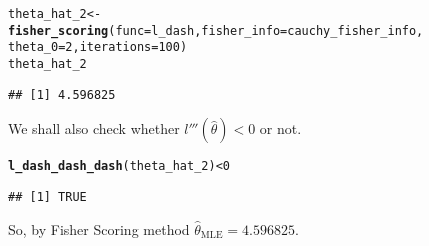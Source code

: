 \documentclass[11pt, a4paper]{article}\usepackage[]{graphicx}\usepackage[]{xcolor}
\makeatletter
\newcommand{\hlnum}[1]{\textcolor[rgb]{0.686,0.059,0.569}{#1}}%
\newcommand{\hlopt}[1]{\textcolor[rgb]{0,0,0}{#1}}%
\newcommand{\hldef}[1]{\textcolor[rgb]{0.345,0.345,0.345}{#1}}%
\newcommand{\hlkwb}[1]{\textcolor[rgb]{0.69,0.353,0.396}{#1}}%
\newcommand{\hlkwc}[1]{\textcolor[rgb]{0.333,0.667,0.333}{#1}}%
\newcommand{\hlkwd}[1]{\textcolor[rgb]{0.737,0.353,0.396}{\textbf{#1}}}%
\newenvironment{kframe}{%
 \def\at@end@of@kframe{}%
 \ifinner\ifhmode%
  \def\at@end@of@kframe{\end{minipage}}%
  \begin{minipage}{\columnwidth}%
 \fi\fi%
 \def\FrameCommand##1{\hskip\@totalleftmargin \hskip-\fboxsep
 \colorbox{shadecolor}{##1}\hskip-\fboxsep
     \hskip-\linewidth \hskip-\@totalleftmargin \hskip\columnwidth}%
 \MakeFramed {\advance\hsize-\width
   \@totalleftmargin\z@ \linewidth\hsize
   \@setminipage}}%
 {\par\unskip\endMakeFramed%
 \at@end@of@kframe}
\newenvironment{knitrout}{}{} %
\makeatother
\begin{document}
\begin{knitrout}
\color{fgcolor}\begin{kframe}
\begin{alltt}
\hldef{theta_hat_2} \hlkwb{<-} \hlkwd{fisher_scoring}\hldef{(}\hlkwc{func} \hldef{= l_dash,} \hlkwc{fisher_info} \hldef{= cauchy_fisher_info,}
                              \hlkwc{theta_0} \hldef{=} \hlnum{2}\hldef{,} \hlkwc{iterations} \hldef{=} \hlnum{100}\hldef{)}
\hldef{theta_hat_2}
\end{alltt}
\begin{verbatim}
## [1] 4.596825
\end{verbatim}
\end{kframe}
\end{knitrout}

We shall also check whether $l'''(\hat{\theta}) < 0$ or not.

\begin{knitrout}
\color{fgcolor}\begin{kframe}
\begin{alltt}
\hlkwd{l_dash_dash_dash}\hldef{(theta_hat_2)} \hlopt{<} \hlnum{0}
\end{alltt}
\begin{verbatim}
## [1] TRUE
\end{verbatim}
\end{kframe}
\end{knitrout}

So, by Fisher Scoring method $\hat{\theta}_{\text{MLE}} = 4.596825$. \\
\end{document}
